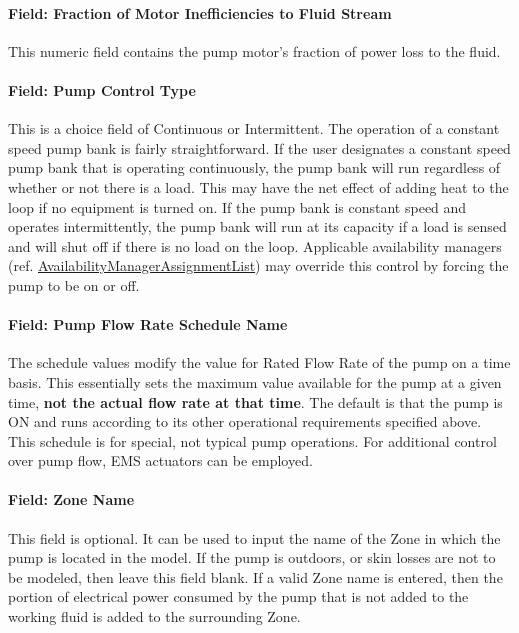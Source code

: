 \paragraph{Field: Fraction of Motor Inefficiencies to Fluid Stream}\label{field-fraction-of-motor-inefficiencies-to-fluid-stream-3}

This numeric field contains the pump motor's fraction of power loss to the fluid.

\paragraph{Field: Pump Control Type}\label{field-pump-control-type-2-000}

This is a choice field of Continuous or Intermittent. The operation of a constant speed pump bank is fairly straightforward. If the user designates a constant speed pump bank that is operating continuously, the pump bank will run regardless of whether or not there is a load. This may have the net effect of adding heat to the loop if no equipment is turned on. If the pump bank is constant speed and operates intermittently, the pump bank will run at its capacity if a load is sensed and will shut off if there is no load on the loop. Applicable availability managers (ref. \hyperref[availabilitymanagerassignmentlist]{AvailabilityManagerAssignmentList}) may override this control by forcing the pump to be on or off.

\paragraph{Field: Pump Flow Rate Schedule Name}\label{field-pump-flow-rate-schedule-name-3}

The schedule values modify the value for Rated Flow Rate of the pump on a time basis. This essentially sets the maximum value available for the pump at a given time, \textbf{not the actual flow rate at that time}. The default is that the pump is ON and runs according to its other operational requirements specified above. This schedule is for special, not typical pump operations. For additional control over pump flow, EMS actuators can be employed.

\paragraph{Field: Zone Name}\label{field-zone-name-3-003}

This field is optional. It can be used to input the name of the Zone in which the pump is located in the model. If the pump is outdoors, or skin losses are not to be modeled, then leave this field blank. If a valid Zone name is entered, then the portion of electrical power consumed by the pump that is not added to the working fluid is added to the surrounding Zone.

